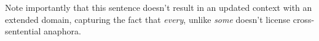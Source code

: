 \documentclass[cronos,landscape,paper=letter]{ling-handout}
\begin{document}
Note importantly that this sentence doesn't result in an updated context with an extended domain, capturing the fact that \textit{every}, unlike \textit{some} doesn't license cross-sentential anaphora.










\end{document}
